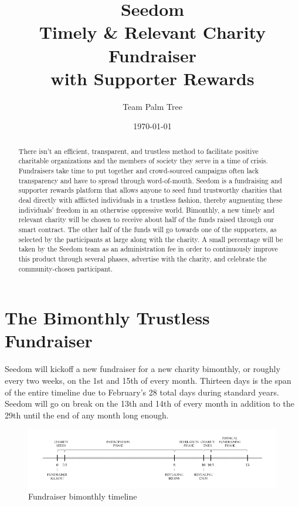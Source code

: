 \documentclass[11pt]{article}
\begin{document}
\title{%
\Huge Seedom \\[4mm]
\large Timely \& Relevant Charity Fundraiser  \\[1mm]
with Supporter Rewards}
\author{Team Palm Tree}
\date{\today}
\maketitle

\begin{abstract}
There isn't an efficient, transparent, and trustless method to facilitate positive charitable organizations and the members of society they serve in a time of crisis. Fundraisers take time to put together and crowd-sourced campaigns often lack transparency and have to spread through word-of-mouth. Seedom is a fundraising and supporter rewards platform that allows anyone to seed fund trustworthy charities that deal directly with afflicted individuals in a trustless fashion, thereby augmenting these individuals' freedom in an otherwise oppressive world. Bimonthly, a new timely and relevant charity will be chosen to receive about half of the funds raised through our smart contract. The other half of the funds will go towards one of the supporters, as selected by the participants at large along with the charity. A small percentage will be taken by the Seedom team as an administration fee in order to continuously improve this product through several phases, advertise with the charity, and celebrate the community-chosen participant.
\end{abstract}
\pagebreak

\tableofcontents
\pagebreak

\section{The Bimonthly Trustless Fundraiser}

Seedom will kickoff a new fundraiser for a new charity bimonthly, or roughly every two weeks, on the 1st and 15th of every month. Thirteen days is the span of the entire timeline due to February's 28 total days during standard years. Seedom will go on break on the 13th and 14th of every month in addition to the 29th until the end of any month long enough.

\begin{figure}[!htb]
\begin{center}
\includegraphics[width=1.0\textwidth]{fundraiserBimonthlyTimeline.png}
\caption{Fundraiser bimonthly timeline}
\label{figure:fundraiserBimonthlyTimeline}
\end{center}
\end{figure}
\end{document}
